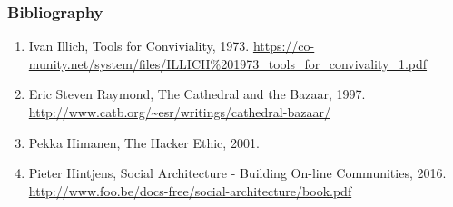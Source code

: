 \documentclass{beamer}
\begin{document}
\appendix
	\backupbegin
	  \begin{frame}
	    \frametitle{Bibliography}
        \begin{enumerate}
                \item Ivan Illich, Tools for Conviviality, 1973. {\tiny \url{https://co-munity.net/system/files/ILLICH\%201973\_tools\_for\_convivality\_1.pdf}}
                \item Eric Steven Raymond, The Cathedral and the Bazaar, 1997. {\tiny \url{http://www.catb.org/~esr/writings/cathedral-bazaar/}}
                \item Pekka Himanen, The Hacker Ethic, 2001.
                \item Pieter Hintjens, Social Architecture - Building On-line Communities, 2016. {\tiny \url{http://www.foo.be/docs-free/social-architecture/book.pdf}}
        \end{enumerate}
	  \end{frame}
	\backupend
\end{document}
